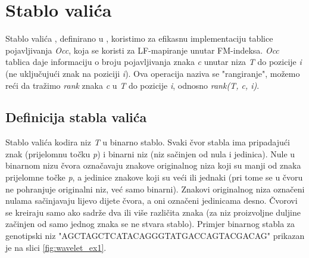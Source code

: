 \documentclass[times, utf8, seminar, numeric]{fer}
\begin{document}
\chapter{Stablo valića}

Stablo valića , definirano u \cite{Grossi:2003:HET:644108.644250},
koristimo za efikasnu implementaciju 
tablice pojavljivanja \textit{Occ}, koja se koristi za LF-mapiranje unutar
FM-indeksa. \textit{Occ} tablica daje informaciju o broju
pojavljivanja znaka \textit{c} unutar niza \textit{T} do pozicije \textit{i}
(ne uključujući znak na poziciji \textit{i}). Ova operacija naziva se "rangiranje",
možemo reći da tražimo \textit{rank} znaka \textit{c} u \textit{T} do pozicije \textit{i},
odnosno \textit{rank(T, c, i)}.

\section{Definicija stabla valića}

Stablo valića kodira niz \textit{T} u binarno stablo. Svaki čvor stabla ima pripadajući
znak (prijelomnu točku \textit{p}) i binarni niz (niz sačinjen od nula i jedinica). Nule u 
binarnom nizu čvora označavaju znakove
originalnog niza koji su manji od znaka prijelomne točke \textit{p}, a jedinice
znakove koji su veći ili jednaki (pri tome se u čvoru ne pohranjuje originalni niz, već
samo binarni). Znakovi originalnog niza označeni nulama sačinjavaju lijevo
dijete čvora, a oni označeni jedinicama desno. Čvorovi se kreiraju samo ako sadrže dva ili više
različita znaka (za niz proizvoljne duljine začinjen od samo jednog znaka se ne stvara stablo).
 Primjer binarnog stabla za genotipski niz "AGCTAGCTCATACAGGGTATGACCAGTACGACAG"
prikazan je na slici \ref{fig:wavelet_ex1}.
\end{document}
